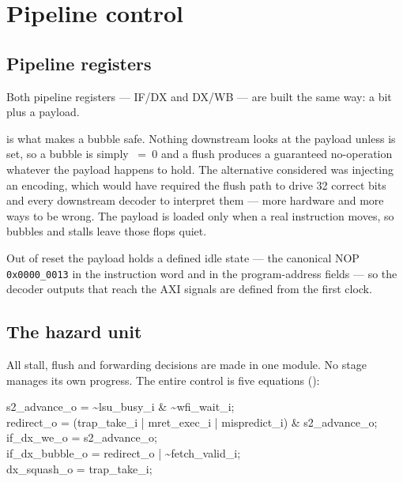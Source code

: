 \chapter{Pipeline control}
\label{ch:pipectl}

\section{Pipeline registers}

Both pipeline registers --- IF/DX and DX/WB --- are built the same way: a
 bit plus a payload.

 is what makes a bubble safe. Nothing downstream looks at the payload
unless  is set, so a bubble is simply ~=~0 and a flush
produces a guaranteed no-operation whatever the payload happens to hold. The
alternative considered was injecting an  encoding, which would
have required the flush path to drive 32 correct bits and every downstream
decoder to interpret them --- more hardware and more ways to be wrong. The
payload is loaded only when a real instruction moves, so bubbles and stalls
leave those flops quiet.

Out of reset the payload holds a defined idle state --- the canonical NOP
\texttt{0x0000\_0013} in the instruction word and  in the
program-address fields --- so the decoder outputs that reach the AXI
 signals are defined from the first clock.

\section{The hazard unit}

All stall, flush and forwarding decisions are made in one module. No stage
manages its own progress. The entire control is five equations
():

\begin{center}
\begin{minipage}{0.72\linewidth}
\ttfamily\small
s2\_advance\_o   = \textasciitilde lsu\_busy\_i \& \textasciitilde wfi\_wait\_i;\\
redirect\_o      = (trap\_take\_i | mret\_exec\_i | mispredict\_i) \& s2\_advance\_o;\\
if\_dx\_we\_o     = s2\_advance\_o;\\
if\_dx\_bubble\_o = redirect\_o | \textasciitilde fetch\_valid\_i;\\
dx\_squash\_o     = trap\_take\_i;
\end{minipage}
\end{center}

